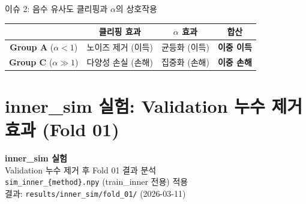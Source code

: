 \documentclass[aspectratio=169,10pt]{beamer}
\begin{document}
\begin{frame}[shrink=5]{이슈 2: 음수 유사도 클리핑과 \(\alpha\)의 상호작용}
	\vspace{0.3em}
	\begin{center}
	\renewcommand{\arraystretch}{1.2}
	\begin{tabular}{c|c|c|c}
		\toprule
		& 클리핑 효과 & \(\alpha\) 효과 & 합산 \\
		\midrule
		\textbf{Group A} (\(\alpha<1\)) & 노이즈 제거 (이득) & 균등화 (이득) & \textcolor{testgreen}{\textbf{이중 이득}} \\
		\textbf{Group C} (\(\alpha\gg1\)) & 다양성 손실 (손해) & 집중화 (손해) & \textcolor{negred}{\textbf{이중 손해}} \\
		\bottomrule
	\end{tabular}
	\end{center}
\end{frame}

\section{inner\_sim 실험: Validation 누수 제거 효과 (Fold 01)}

\begin{frame}[plain]
	\begin{center}
		\vspace{2.2cm}
		{\LARGE \textbf{inner\_sim 실험}}\\[0.8em]
		{\large Validation 누수 제거 후 Fold 01 결과 분석}\\[0.6em]
		{\small \texttt{sim\_inner\_\{method\}.npy} (train\_inner 전용) 적용\\
		결과: \texttt{results/inner\_sim/fold\_01/} (2026-03-11)}
	\end{center}
\end{frame}
\end{document}
